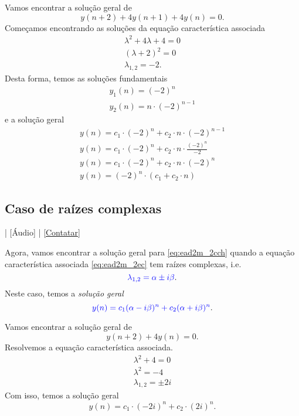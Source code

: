 \begin{ex}
  Vamos encontrar a solução geral de
  \begin{equation}
    y(n+2)+4y(n+1)+4y(n)=0.
  \end{equation}
  Começamos encontrando as soluções da equação característica associada
  \begin{gather}
    \lambda^2 + 4\lambda + 4 = 0\\
    (\lambda+2)^2 = 0 \\
    \lambda_{1,2} = -2.
  \end{gather}
  Desta forma, temos as soluções fundamentais
  \begin{gather}
    y_1(n) = (-2)^n\\
    y_2(n) = n\cdot (-2)^{n-1}
  \end{gather}
  e a solução geral
  \begin{gather}
    y(n) = c_1\cdot (-2)^n + c_2\cdot n\cdot (-2)^{n-1}\\
    y(n) = c_1\cdot (-2)^n + c_2\cdot n\cdot \frac{(-2)^n}{-2}\\
    y(n) = c_1\cdot(-2)^n + c_2\cdot n \cdot (-2)^n\\
    y(n) = (-2)^n\cdot \left(c_1 + c_2\cdot n\right)
  \end{gather}
\end{ex}

\subsection{Caso de raízes complexas}

\begin{flushright}
  [Vídeo] | [Áudio] | \href{https://phkonzen.github.io/notas/contato.html}{[Contatar]}
\end{flushright}

Agora, vamos encontrar a solução geral para \eqref{eq:ead2m_2cch} quando a equação característica associada \eqref{eq:ead2m_2ec} tem raízes complexas, i.e.
\begin{equation}
  {\color{blue}\lambda_{1,2} = \alpha \pm i\beta}.
\end{equation}
Neste caso, temos a \emph{solução geral}
\begin{equation}
  {\color{blue}y(n) = c_1(\alpha-i\beta)^n + c_2(\alpha + i\beta)^n}.
\end{equation}

\begin{ex}
  Vamos encontrar a solução geral de
  \begin{equation}
    y(n+2) + 4y(n) = 0.
  \end{equation}
  Resolvemos a equação característica associada.
  \begin{gather}
    \lambda^2 + 4 = 0\\
    \lambda^2 = -4 \\
    \lambda_{1,2} = \pm 2i
  \end{gather}
  Com isso, temos a solução geral
  \begin{equation}
    y(n) = c_1\cdot (-2i)^n + c_2\cdot (2i)^n.
  \end{equation}
\end{ex}


